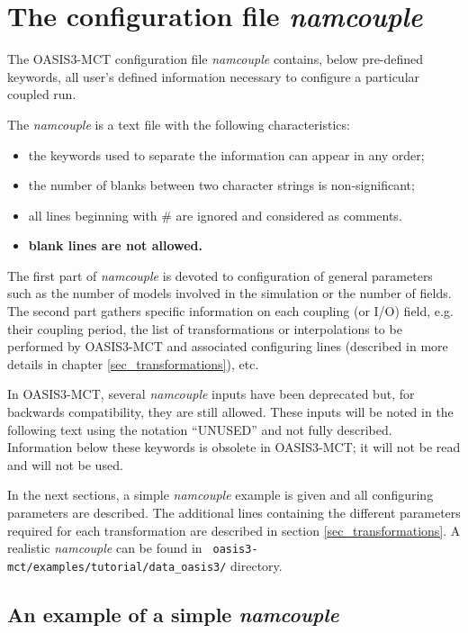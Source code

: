 \newpage
\chapter{The configuration file {\it namcouple}}
\label{sec_namcouple}

The OASIS3-MCT configuration file {\it namcouple} contains, below
pre-defined keywords, all user's defined information necessary to
configure a particular coupled run.

The {\it namcouple} is a text file with the following characteristics:

\begin{itemize}
\item the keywords used to separate the information can appear in any
  order;
\item the number of blanks between two character strings is
  non-significant;
\item all lines beginning with \# are ignored and considered as
  comments.
\item {\bf blank lines are not allowed.}
\end{itemize}

The first part of {\it namcouple } is devoted to configuration of
general parameters such as the number of models involved in the
simulation or the number of fields.  The second part gathers specific
information on each coupling (or I/O) field, e.g. their coupling
period, the list of transformations or interpolations to be performed
by OASIS3-MCT and associated configuring lines (described in more
details in chapter \ref{sec_transformations}), etc.

In OASIS3-MCT, several {\it namcouple} inputs have been deprecated
but, for backwards compatibility, they are still allowed.  These
inputs will be noted in the following text using the notation
``UNUSED'' and not fully described. Information below these keywords
is obsolete in OASIS3-MCT; it will not be read and will not be used.

In the next sections, a simple {\it namcouple} example is given and
all configuring parameters are described. The additional lines
containing the different parameters required for each transformation
are described in section \ref{sec_transformations}. A realistic {\it
  namcouple} can be found in {\tt
  oasis3-mct/examples/tutorial/data\_oasis3/} directory.

\section{An example of a simple {\it namcouple}}
\label{subsec_examplenamcouple}

